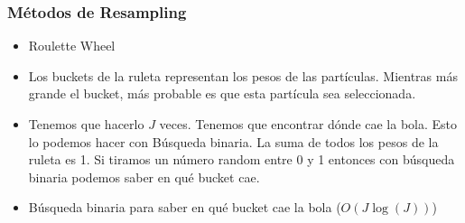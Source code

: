 \begin{frame}
    \frametitle{Métodos de Resampling}

    \scriptsize

    
    \begin{itemize}
        \item Roulette Wheel
        \item Los buckets de la ruleta representan los pesos de las partículas. Mientras más grande el bucket, más probable es que esta partícula sea seleccionada.
        \item Tenemos que hacerlo $J$ veces. Tenemos que encontrar dónde cae la bola. Esto lo podemos hacer con Búsqueda binaria. La suma de todos los pesos de la ruleta es 1. Si tiramos un número random entre 0 y 1 entonces con búsqueda binaria podemos saber en qué bucket cae.
        \item Búsqueda binaria para saber en qué bucket cae la bola ($O(J \log(J))$)
    \end{itemize}

\end{frame}

